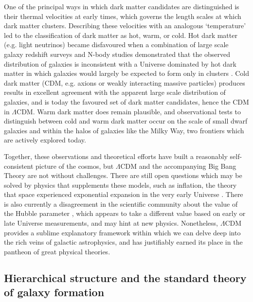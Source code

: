 One of the principal ways in which dark matter candidates are distinguished is their thermal velocities at early times, which governs the length scales at which dark matter clusters. Describing these velocities with an analogous `temperature' led to the classification of dark matter as hot, warm, or cold. Hot dark matter (e.g. light neutrinos) became disfavoured when a combination of large scale galaxy redshift surveys and N-body studies demonstrated that the observed distribution of galaxies is inconsistent with a Universe dominated by hot dark matter in which galaxies would largely be expected to form only in clusters \parencite{white83}. Cold dark matter (CDM, e.g. axions or weakly interacting massive particles) produces results in excellent agreement with the apparent large scale distribution of galaxies, and is today the favoured set of dark matter candidates, hence the CDM in $\Lambda$CDM. Warm dark matter does remain plausible, and observational tests to distinguish between cold and warm dark matter occur on the scale of small dwarf galaxies and within the halos of galaxies like the Milky Way, two frontiers which are actively explored today.

Together, these observations and theoretical efforts have built a reasonably self-consistent picture of the cosmos, but $\Lambda$CDM and the accompanying Big Bang Theory are not without challenges. There are still open questions which may be solved by physics that supplements these models, such as inflation, the theory that space experienced exponential expansion in the very early Universe \parencite{guth81,linde82}. There is also currently a disagreement in the scientific community about the value of the Hubble parameter \parencite[see][]{divalentino21}, which appears to take a different value based on early or late Universe measurements, and may hint at new physics. Nonetheless, $\Lambda$CDM provides a sublime explanatory framework within which we can delve deep into the rich veins of galactic astrophysics, and has justifiably earned its place in the pantheon of great physical theories.

\subsection{Hierarchical structure and the standard theory of galaxy formation}

